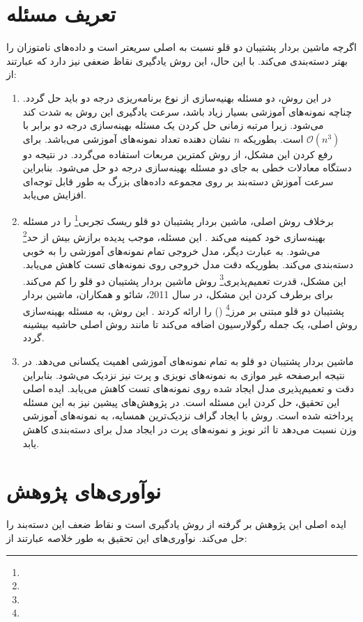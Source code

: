 \section{تعریف مسئله} \label{sec:1:2}
اگرچه ماشین بردار پشتیبان دو قلو نسبت به  اصلی سریعتر است و داده‌های نامتوزان را بهتر دسته‌بندی می‌کند. با این حال، این روش یادگیری نقاظ ضعفی نیز دارد که عبارتند از:
\begin{enumerate}
	\item 	در این روش، دو مسئله بهنیه‌سازی از نوع برنامه‌ریزی درجه دو باید حل گردد. چناچه نمونه‌های آموزشی بسیار زیاد باشد، سرعت یادگیری این روش به شدت کند می‌شود. زیرا مرتبه زمانی حل کردن یک مسئله بهینه‌سازی درجه دو برابر با $\mathcal{O}(n^3)$ است. بطوریکه $n$ نشان دهنده تعداد نمونه‌های آموزشی می‌باشد. برای رفع کردن این مشکل، از روش کمترین مربعات  \cite{kumar2009} استفاده می‌گردد. در نتیجه دو دستگاه معادلات خطی به جای دو مسئله بهینه‌سازی درجه دو حل می‌شود. بنابراین سرعت آموزش دسته‌بند بر روی مجموعه داده‌های بزرگ به طور قابل توجه‌ای افزایش می‌یابد.
	\item برخلاف روش  اصلی، ماشین بردار پشتیبان دو قلو ریسک تجربی\footnote{} را در مسئله بهینه‌سازی خود کمینه می‌کند .\cite{shao2011} این مسئله، موجب پدیده برازش بیش از حد\footnote{} می‌شود. به عبارت دیگر، مدل خروجی تمام نمونه‌های آموزشی را به خوبی دسته‌بندی می‌کند. بطوریکه دقت مدل خروجی روی نمونه‌های تست کاهش می‌یابد. این مشکل، قدرت تعمیم‌پذیری\footnote{} روش ماشین بردار پشتیبان دو قلو را کم می‌کند. برای برطرف کردن این مشکل، در سال 2011، شائو و همکاران، ماشین بردار پشتیبان دو قلو مبتنی بر مرز\footnote{}  () را ارائه کردند \cite{shao2011}. این روش، به مسئله بهینه‌سازی روش  اصلی، یک جمله رگولارسیون اضافه می‌کند تا مانند روش  اصلی حاشیه بیشینه گردد.
	\item ماشین بردار پشتیبان دو قلو به تمام نمونه‌های آموزشی اهمیت یکسانی می‌دهد. در نتیجه ابرصفحه غیر موازی به نمونه‌های نویزی و پرت نیز نزدیک می‌شود. بنابراین دقت و تعمیم‌پذیری مدل ایجاد شده روی نمونه‌های تست کاهش می‌یابد. ایده اصلی این تحقیق، حل کردن این مسئله است. در پژوهش‌های پیشین نیز به این مسئله پرداخته شده است. روش  \cite{ye2012} با ایجاد گراف نزدیک‌ترین همسایه، به نمونه‌های آموزشی وزن نسبت می‌دهد تا اثر نویز و نمونه‌های پرت در ایجاد مدل برای دسته‌بندی کاهش یابد.
\end{enumerate}

\section{نوآوری‌های پژوهش} \label{sec:1:3}
ایده اصلی این پژوهش بر گرفته از روش یادگیری   \cite{ye2012} است و نقاط ضعف این دسته‌بند را حل می‌کند. نوآوری‌های این تحقیق به طور خلاصه عبارتند از:

